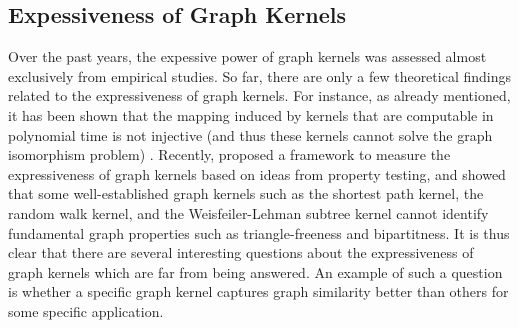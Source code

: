 \documentclass[twoside,11pt]{article}
\begin{document}
\subsection{Expessiveness of Graph Kernels}
Over the past years, the expessive power of graph kernels was assessed almost exclusively from empirical studies.
So far, there are only a few theoretical findings related to the expressiveness of graph kernels.
For instance, as already mentioned, it has been shown that the mapping induced by kernels that are computable in polynomial time is not injective (and thus these kernels cannot solve the graph isomorphism problem) .
Recently,  proposed a framework to measure the expressiveness of graph kernels based on ideas from property testing, and showed that some well-established graph kernels such as the shortest path kernel, the random walk kernel, and the Weisfeiler-Lehman subtree kernel cannot identify fundamental graph properties such as triangle-freeness and bipartitness.
It is thus clear that there are several interesting questions about the expressiveness of graph kernels which are far from being answered.
An example of such a question is whether a specific graph kernel captures graph similarity better than others for some specific application.
\end{document}

